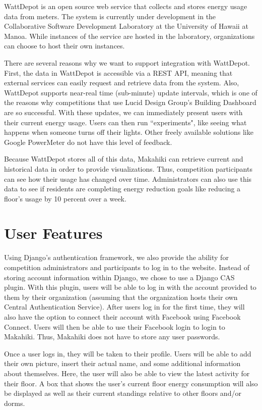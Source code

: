 WattDepot is an open source web service that collects and stores energy usage data from meters.  The system is currently under development in the Collaborative Software Development Laboratory at the University of Hawaii at Manoa.  While instances of the service are hosted in the laboratory, organizations can choose to host their own instances.

There are several reasons why we want to support integration with WattDepot.  First, the data in WattDepot is accessible via a REST API\cite{wattdepot-rest}, meaning that external services can easily request and retrieve data from the system.  Also, WattDepot supports near-real time (sub-minute) update intervals, which is one of the reasons why competitions that use Lucid Design Group's Building Dashboard are so successful.  With these updates, we can immediately present users with their current energy usage.  Users can then run ``experiments", like seeing what happens when someone turns off their lights.  Other freely available solutions like Google PowerMeter\cite{google-powermeter} do not have this level of feedback.

Because WattDepot stores all of this data, Makahiki can retrieve current and historical data in order to provide visualizations.  Thus, competition participants can see how their usage has changed over time.  Administrators can also use this data to see if residents are completing energy reduction goals like reducing a floor's usage by 10 percent over a week.

\section{User Features}
\label{user}

Using Django's authentication framework, we also provide the ability for competition administrators and participants to log in to the website.  Instead of storing account information within Django, we chose to use a Django CAS plugin\cite{django-cas}.  With this plugin, users will be able to log in with the account provided to them by their organization (assuming that the organization hosts their own Central Authentication Service).  After users log in for the first time, they will also have the option to connect their account with Facebook using Facebook Connect.  Users will then be able to use their Facebook login to login to Makahiki.  Thus, Makahiki does not have to store any user passwords.

Once a user logs in, they will be taken to their profile.  Users will be able to add their own picture, insert their actual name, and some additional information about themselves.  Here, the user will also be able to view the latest activity for their floor.  A box that shows the user's current floor energy consumption will also be displayed as well as their current standings relative to other floors and/or dorms.


